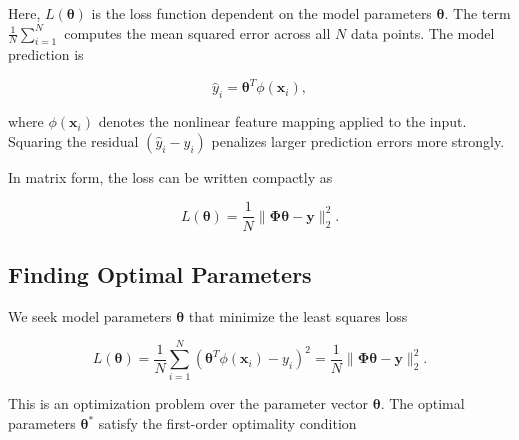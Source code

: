 \documentclass{article}
\begin{document}
Here, $L(\boldsymbol{\theta})$ is the loss function dependent on the model parameters $\boldsymbol{\theta}$. The term $\frac{1}{N}\sum_{i=1}^N$ computes the mean squared error across all $N$ data points. The model prediction is

\[
\hat{y}_i = \boldsymbol{\theta}^T \phi(\mathbf{x}_i),
\]

where $\phi(\mathbf{x}_i)$ denotes the nonlinear feature mapping applied to the input. Squaring the residual $(\hat{y}_i - y_i)$ penalizes larger prediction errors more strongly.

In matrix form, the loss can be written compactly as

\[
L(\boldsymbol{\theta})
= \frac{1}{N} \|\boldsymbol{\Phi}\boldsymbol{\theta} - \mathbf{y}\|_2^2.
\]









\subsection{Finding Optimal Parameters}

We seek model parameters $\boldsymbol{\theta}$ that minimize the least squares loss

\[
L(\boldsymbol{\theta}) 
= \frac{1}{N} \sum_{i=1}^{N} (\boldsymbol{\theta}^T \phi(\mathbf{x}_i) - y_i)^2
= \frac{1}{N}\|\boldsymbol{\Phi}\boldsymbol{\theta} - \mathbf{y}\|_2^2.
\]

This is an optimization problem over the parameter vector $\boldsymbol{\theta}$.  
The optimal parameters $\boldsymbol{\theta}^\ast$ satisfy the first-order optimality condition
\end{document}
